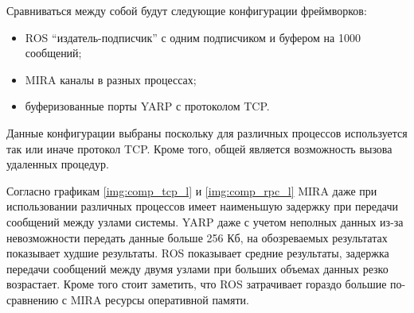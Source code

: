 Сравниваться между собой будут следующие конфигурации фреймворков:
\begin{itemize}
	\item ROS \enquote{издатель-подписчик} с одним подписчиком и буфером на 1000 сообщений;
	\item MIRA каналы в разных процессах;
	\item буферизованные порты YARP с протоколом TCP.
\end{itemize}

Данные конфигурации выбраны поскольку для различных процессов используется так или иначе протокол TCP. Кроме того, общей является возможность вызова удаленных процедур.


Согласно графикам \ref{img:comp_tcp_l} и \ref{img:comp_rpc_l} MIRA даже при использовании различных процессов имеет наименьшую задержку при передачи сообщений между узлами системы. YARP даже с учетом неполных данных из-за невозможности передать данные больше 256 Кб, на обозреваемых результатах показывает худшие результаты. ROS показывает средние результаты, задержка передачи сообщений между двумя узлами при больших объемах данных резко возрастает. Кроме того стоит заметить, что ROS затрачивает гораздо большие по-сравнению с MIRA ресурсы оперативной памяти.
